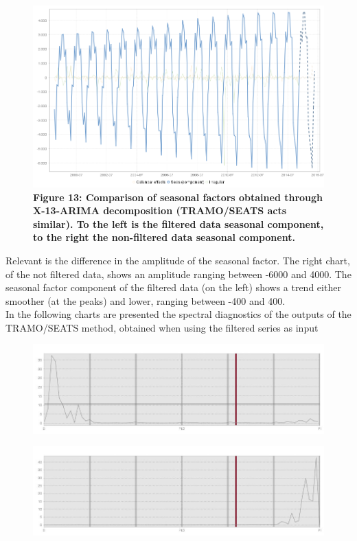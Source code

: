 \documentclass{article}
\begin{document}
\begin{figure}[H]
    \includegraphics[width=\textwidth]{../images/capitolo4/X13_seas_cmp_plan.jpg}
      {\textbf{\scriptsize Figure 13: Comparison of seasonal factors obtained through X-13-ARIMA decomposition (TRAMO/SEATS acts similar). To the left is the filtered data seasonal component, to the right the non-filtered data seasonal component.}}
  \end{figure}
Relevant is the difference in the amplitude of the seasonal factor. The right chart, of the not filtered data, shows an amplitude ranging between -6000 and 4000. The seasonal factor component of the filtered data (on the left) shows a trend either smoother (at the peaks) and lower, ranging between -400 and 400.\\In the following charts are presented the spectral diagnostics of the outputs of the TRAMO/SEATS method, obtained when using the filtered series as input
\begin{figure}[H]
  \includegraphics[width=\textwidth]{../images/capitolo4/TSresper.jpg}
\end{figure}
\begin{figure}[H]
  \includegraphics[width=\textwidth]{../images/capitolo4/TSirrper.jpg}
\end{figure} 
\end{document}
